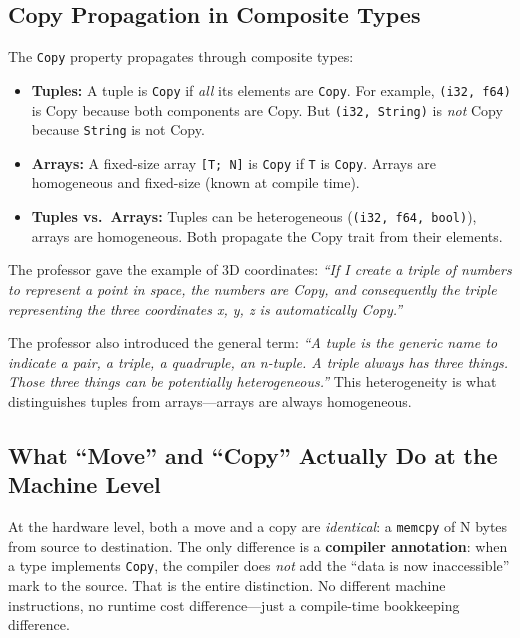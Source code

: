 \subsection{Copy Propagation in Composite Types}

The \texttt{Copy} property propagates through composite types:

\begin{itemize}
    \item \textbf{Tuples:} A tuple is \texttt{Copy} if \emph{all} its elements are \texttt{Copy}. For example, \texttt{(i32, f64)} is Copy because both components are Copy. But \texttt{(i32, String)} is \emph{not} Copy because \texttt{String} is not Copy.
    \item \textbf{Arrays:} A fixed-size array \texttt{[T; N]} is \texttt{Copy} if \texttt{T} is \texttt{Copy}. Arrays are homogeneous and fixed-size (known at compile time).
    \item \textbf{Tuples vs.\ Arrays:} Tuples can be heterogeneous (\texttt{(i32, f64, bool)}), arrays are homogeneous. Both propagate the Copy trait from their elements.
\end{itemize}

The professor gave the example of 3D coordinates: \emph{``If I create a triple of numbers to represent a point in space, the numbers are Copy, and consequently the triple representing the three coordinates x, y, z is automatically Copy.''}

The professor also introduced the general term: \emph{``A tuple is the generic name to indicate a pair, a triple, a quadruple, an n-tuple. A triple always has three things. Those three things can be potentially heterogeneous.''} This heterogeneity is what distinguishes tuples from arrays---arrays are always homogeneous.

\subsection{What ``Move'' and ``Copy'' Actually Do at the Machine Level}

At the hardware level, both a move and a copy are \emph{identical}: a \texttt{memcpy} of N bytes from source to destination. The only difference is a \textbf{compiler annotation}: when a type implements \texttt{Copy}, the compiler does \emph{not} add the ``data is now inaccessible'' mark to the source. That is the entire distinction. No different machine instructions, no runtime cost difference---just a compile-time bookkeeping difference.

